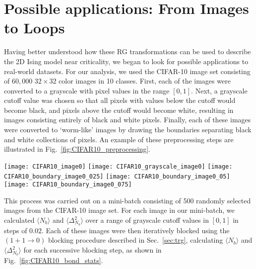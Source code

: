 \documentclass[../main.tex]{subfiles}
\begin{document}
\section{Possible applications: From Images to Loops}%
\label{sec:cifar}
Having better understood how these RG transformations can be used to describe the 2D Ising model near criticality, we
began to look for possible applications to real-world datasets. For our analysis, we used the CIFAR-10
\cite{Krizhevsky09} image set consisting of $60,000$ $32\times32$ color images in 10 classes. First, each of the images
were converted to a grayscale with pixel values in the range $[0, 1]$. Next, a grayscale cutoff value was chosen so
that all pixels with values below the cutoff would become black, and pixels above the cutoff would become white,
resulting in images consisting entirely of black and white pixels. Finally, each of these images were converted to
`worm-like' images by drawing the boundaries separating black and white collections of pixels. An example of these
preprocessing steps are illustrated in Fig.~\ref{fig:CIFAR10_preprocessing}.
%
\begin{figure*}[htpb]
    \centering
    \texttt{[image: CIFAR10\_image0]}\hspace{1.5cm}
    \texttt{[image: CIFAR10\_grayscale\_image0]}
    \texttt{[image: CIFAR10\_boundary\_image0\_025]}\hfill
    \texttt{[image: CIFAR10\_boundary\_image0\_05]}\hfill
    \texttt{[image: CIFAR10\_boundary\_image0\_075]}
    \caption{\label{fig:CIFAR10_preprocessing} Example of preprocessing steps
        for converting CIFAR-10 images to `worm-like' images, illustrating the
        resulting image for different values of the grayscale cuttoff. (a)
    Original image from CIFAR-10 dataset. (b) Image converted to grayscale.
    (c) Resulting image from cutoff values of $0.25$, (d) $0.5$, and (e)
    $0.75$.}
\end{figure*}
%
This process was carried out on a mini-batch consisting of 500 randomly selected images from the CIFAR-10 image set.
For each image in our mini-batch, we calculated $\langle N_b\rangle$ and $\langle \Delta_{N_b}^2\rangle$ over a range
of grayscale cutoff values in $[0, 1]$ in steps of $0.02$. Each of these images were then iteratively blocked using the
$(1 + 1 \rightarrow 0)$ blocking procedure described in Sec.~\ref{sec:trg}, calculating $\langle N_b\rangle$ and
$\langle \Delta_{N_b}^2\rangle$ for each successive blocking step, as shown in Fig.~\ref{fig:CIFAR10_bond_stats}.
\end{document}
